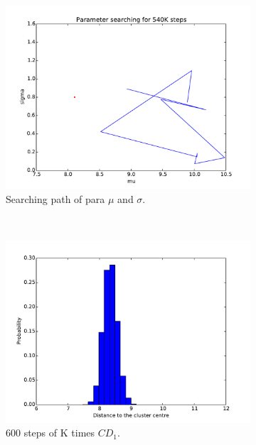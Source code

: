 \begin{figure}[hbt]
\begin{subfigure}[t]{0.18\textwidth}
			\includegraphics[width=\textwidth]{pics_sdbn/cd1_para.pdf}
		    \caption{Searching path of para $\mu$ and $\sigma$.}
		\end{subfigure}\\
		\begin{subfigure}[t]{0.18\textwidth}
			\includegraphics[width=\textwidth]{pics_sdbn/kcd_100.pdf}
		    \caption{$600$ steps of K times $CD_1$.}
		\end{subfigure}
		\begin{subfigure}[t]{0.18\textwidth}

\end{subfigure}
\end{figure}
